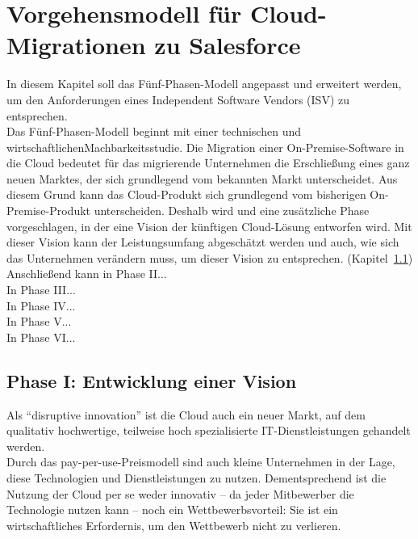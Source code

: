 \section{Vorgehensmodell für Cloud-Migrationen zu Salesforce}
\label{cha:entwickelung_vorgehensmodell}
In diesem Kapitel soll das Fünf-Phasen-Modell angepasst und erweitert werden, 
um den Anforderungen eines Independent Software Vendors (ISV) zu entsprechen. \\

Das Fünf-Phasen-Modell beginnt mit einer technischen und 
wirtschaftlichenMachbarkeitsstudie. Die Migration einer On-Premise-Software in 
die Cloud bedeutet für das migrierende Unternehmen die Erschließung eines ganz 
neuen Marktes, der sich grundlegend vom bekannten Markt unterscheidet. Aus 
diesem Grund kann das Cloud-Produkt sich grundlegend vom bisherigen 
On-Premise-Produkt unterscheiden. Deshalb wird 
 und 
 eine zusätzliche 
Phase vorgeschlagen, in der eine Vision der künftigen Cloud-Lösung entworfen 
wird. Mit dieser Vision kann der Leistungsumfang abgeschätzt werden und auch, 
wie sich das Unternehmen verändern muss, um dieser Vision zu entsprechen. 
(Kapitel~\ref{cha:phaseI})\\

Anschließend kann in Phase II... \\

In Phase III... \\

In Phase IV... \\

In Phase V... \\

In Phase VI... \\

\subsection{Phase I: Entwicklung einer Vision}
\label{cha:phaseI}

Als "`disruptive innovation"' ist die Cloud auch ein neuer Markt, auf dem 
qualitativ hochwertige, teilweise hoch spezialisierte IT-Dienstleistungen 
gehandelt werden. 
 \\
Durch das pay-per-use-Preismodell sind auch kleine Unternehmen in der Lage, 
diese Technologien und Dienstleistungen zu nutzen. 
 Dementsprechend ist die Nutzung der Cloud per se 
weder  innovativ -- da jeder Mitbewerber die Technologie nutzen kann -- noch 
ein Wettbewerbsvorteil: Sie ist ein wirtschaftliches Erfordernis, um den 
Wettbewerb nicht zu verlieren. 


